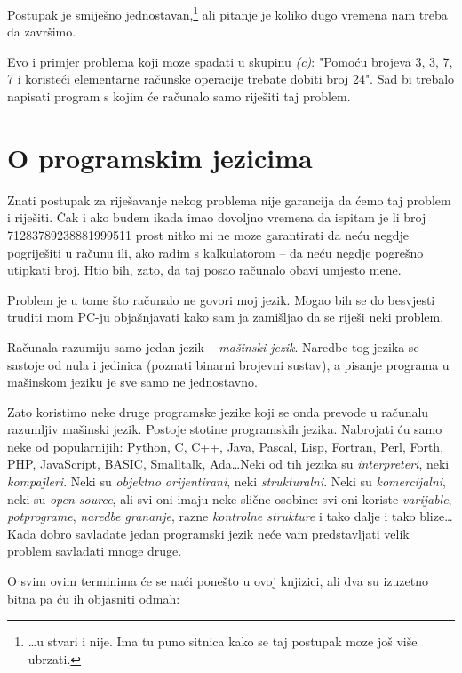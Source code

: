 	Postupak je smiješno jednostavan,\footnote{\dots u stvari i nije. Ima tu puno sitnica kako se taj postupak moze
	još više ubrzati.}
	ali pitanje je koliko dugo vremena nam treba
	da završimo. 

	Evo i primjer problema koji moze spadati u skupinu \emph{(c)}: "Pomoću
	brojeva 3, 3, 7, 7 i koristeći elementarne računske operacije trebate
	dobiti broj 24". Sad bi trebalo napisati program s kojim će računalo samo
	riješiti taj problem.

\section{O programskim jezicima}

	Znati postupak za riješavanje nekog problema nije garancija da ćemo taj
	problem i riješiti. 
	Čak i ako budem ikada imao dovoljno vremena da ispitam je li broj
	71283789238881999511 
	prost nitko mi ne moze garantirati da neću negdje
	pogriješiti u računu ili, ako radim s kalkulatorom -- da neću negdje
	pogrešno utipkati broj.
	Htio bih, zato, da taj posao računalo obavi umjesto mene.
	
	Problem je u tome što računalo ne govori moj jezik. 
	Mogao bih se do besvjesti truditi mom PC-ju objašnjavati kako sam ja 
	zamišljao da se riješi neki problem. 

	Računala razumiju samo jedan jezik -- \emph{mašinski jezik}. Naredbe tog
	jezika se sastoje od nula i jedinica (poznati binarni brojevni sustav), a pisanje
	programa u mašinskom jeziku je sve samo ne jednostavno.

	Zato koristimo neke druge programske jezike koji se onda prevode u 
	računalu razumljiv mašinski jezik. 
	Postoje stotine programskih jezika. Nabrojati
	ću samo neke od popularnijih: Python, C, C++, Java, Pascal, Lisp, Fortran, 
	Perl, Forth, PHP, JavaScript, BASIC, Smalltalk, Ada\dots Neki od tih jezika su
	\emph{interpreteri}, neki \emph{kompajleri}. Neki su \emph{objektno orijentirani},
	neki \emph{strukturalni}. Neki su \emph{komercijalni}, neki su \emph{open source},
	ali svi oni imaju neke slične osobine: svi oni koriste \emph{varijable},
	\emph{potprograme}, \emph{naredbe grananje}, razne \emph{kontrolne strukture} i
	tako dalje i tako blize\dots Kada dobro savladate jedan programski
	jezik neće vam predstavljati velik problem savladati mnoge druge.

	O svim ovim terminima će se naći ponešto u ovoj knjizici, ali dva
	su izuzetno bitna pa ću ih objasniti odmah:

